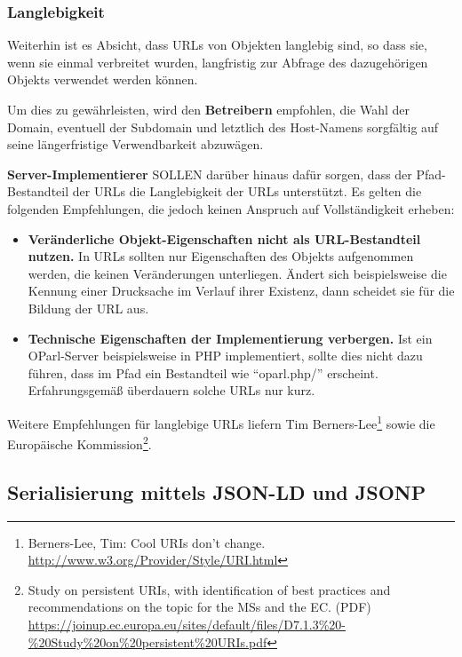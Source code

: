 \documentclass[,a4paper]{article}
\begin{document}
\subsubsection{Langlebigkeit}\label{langlebigkeit}

Weiterhin ist es Absicht, dass URLs von Objekten langlebig sind, so dass
sie, wenn sie einmal verbreitet wurden, langfristig zur Abfrage des
dazugehörigen Objekts verwendet werden können.

Um dies zu gewährleisten, wird den \textbf{Betreibern} empfohlen, die
Wahl der Domain, eventuell der Subdomain und letztlich des Host-Namens
sorgfältig auf seine längerfristige Verwendbarkeit abzuwägen.

\textbf{Server-Implementierer} SOLLEN darüber hinaus dafür sorgen, dass
der Pfad-Bestandteil der URLs die Langlebigkeit der URLs unterstützt. Es
gelten die folgenden Empfehlungen, die jedoch keinen Anspruch auf
Vollständigkeit erheben:

\begin{itemize}
\item
  \textbf{Veränderliche Objekt-Eigenschaften nicht als URL-Bestandteil
  nutzen.} In URLs sollten nur Eigenschaften des Objekts aufgenommen
  werden, die keinen Veränderungen unterliegen. Ändert sich
  beispielsweise die Kennung einer Drucksache im Verlauf ihrer Existenz,
  dann scheidet sie für die Bildung der URL aus.
\item
  \textbf{Technische Eigenschaften der Implementierung verbergen.} Ist
  ein OParl-Server beispielsweise in PHP implementiert, sollte dies
  nicht dazu führen, dass im Pfad ein Bestandteil wie ``oparl.php/''
  erscheint. Erfahrungsgemäß überdauern solche URLs nur kurz.
\end{itemize}

Weitere Empfehlungen für langlebige URLs liefern Tim
Berners-Lee\footnote{Berners-Lee, Tim: Cool URIs don't change.
  \url{http://www.w3.org/Provider/Style/URI.html}} sowie die Europäische
Kommission\footnote{Study on persistent URIs, with identification of
  best practices and recommendations on the topic for the MSs and the
  EC. (PDF)
  \url{https://joinup.ec.europa.eu/sites/default/files/D7.1.3\%20-\%20Study\%20on\%20persistent\%20URIs.pdf}}.

\subsection{Serialisierung mittels JSON-LD und
JSONP}\label{serialisierung-mittels-json-ld-und-jsonp}
\end{document}
